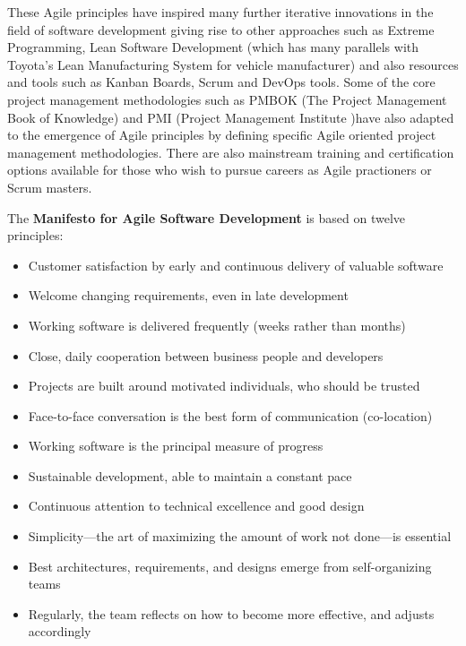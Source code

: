 \documentclass[a4paper,12pt]{article}
\begin{document}
\begin{samepage}
\begin{samepage}
These Agile principles have inspired many further iterative innovations in the field of software development giving rise to other approaches such as Extreme Programming, Lean Software Development (which has many parallels with Toyota's Lean Manufacturing System for vehicle manufacturer) and also resources and tools such as Kanban Boards, Scrum and DevOps tools. Some of the core project management methodologies such as PMBOK (The Project Management Book of Knowledge) and PMI (Project Management Institute )have also adapted to the emergence of Agile principles by defining specific Agile oriented project management methodologies. There are also mainstream training and certification options available for those who wish to pursue careers as Agile practioners or Scrum masters.



The \textbf{Manifesto for Agile Software Development} is based on twelve principles:
\begin{itemize}
\item Customer satisfaction by early and continuous delivery of valuable software
\item Welcome changing requirements, even in late development
\item Working software is delivered frequently (weeks rather than months)
\item Close, daily cooperation between business people and developers
\item Projects are built around motivated individuals, who should be trusted
\item Face-to-face conversation is the best form of communication (co-location)
\item Working software is the principal measure of progress
\item Sustainable development, able to maintain a constant pace
\item Continuous attention to technical excellence and good design
\item Simplicity—the art of maximizing the amount of work not done—is essential
\item Best architectures, requirements, and designs emerge from self-organizing teams
\item Regularly, the team reflects on how to become more effective, and adjusts accordingly
\end{itemize}
\end{samepage}
\begin{samepage}

\end{samepage}
\end{samepage}
\end{document}
